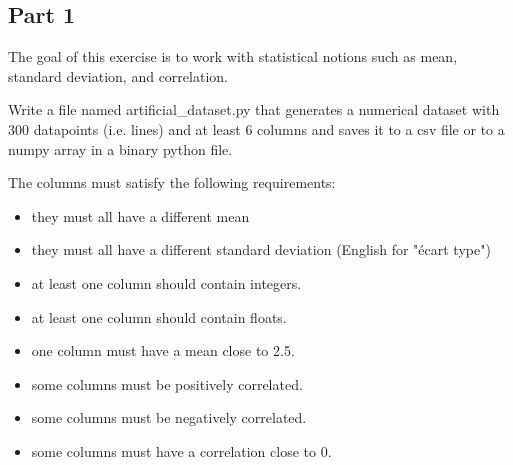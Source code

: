 \documentclass[10pt, a4paper]{article}
\begin{document}

\subsection*{Part 1}

\begin{Problem}
    The goal of this exercise is to work with statistical notions such as mean, standard deviation, and correlation.
    
    Write a file named artificial\_dataset.py that generates a numerical dataset with 300 datapoints (i.e. lines) and at least 6 columns and saves it to a csv file or to a numpy array in a binary python file.

    The columns must satisfy the following requirements:
    \begin{itemize}
        \item they must all have a different mean
        \item they must all have a different standard deviation (English for "écart type")
        \item at least one column should contain integers.
        \item at least one column should contain floats.
        \item one column must have a mean close to 2.5.
        \item some columns must be positively correlated.
        \item some columns must be negatively correlated.
        \item some columns must have a correlation close to 0.
    \end{itemize}
\end{Problem}
\end{document}
